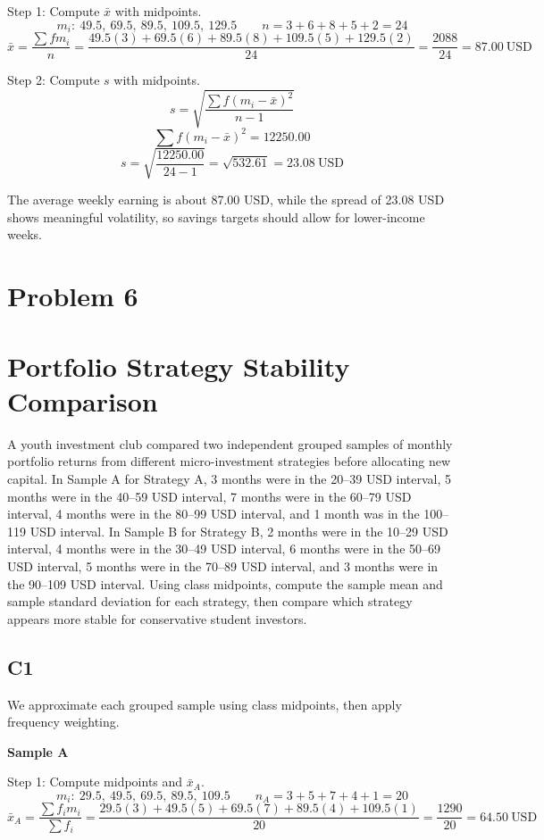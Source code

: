\begin{ExamProblems}
		Step 1: Compute $\bar{x}$ with midpoints.
		\[
		m_i:\ 49.5,\ 69.5,\ 89.5,\ 109.5,\ 129.5
		\qquad
		n = 3+6+8+5+2 = 24
		\]
		\[
		\bar{x} = \frac{\sum f m_i}{n}
		= \frac{49.5(3)+69.5(6)+89.5(8)+109.5(5)+129.5(2)}{24}
		= \frac{2088}{24}
		= 87.00\ \text{USD}
		\]

		Step 2: Compute $s$ with midpoints.
		\[
		s = \sqrt{\frac{\sum f(m_i-\bar{x})^2}{n-1}}
		\]
		\[
		\sum f(m_i-\bar{x})^2 = 12250.00
		\]
		\[
		s = \sqrt{\frac{12250.00}{24-1}} = \sqrt{532.61} = 23.08\ \text{USD}
		\]

		The average weekly earning is about 87.00 USD, while the spread of 23.08 USD shows meaningful volatility, so savings targets should allow for lower-income weeks.

		\newpage
		\item
		\section{Problem 6}
		\section{Portfolio Strategy Stability Comparison}
		A youth investment club compared two independent grouped samples of monthly portfolio returns from different micro-investment strategies before allocating new capital. In Sample A for Strategy A, 3 months were in the 20--39 USD interval, 5 months were in the 40--59 USD interval, 7 months were in the 60--79 USD interval, 4 months were in the 80--99 USD interval, and 1 month was in the 100--119 USD interval. In Sample B for Strategy B, 2 months were in the 10--29 USD interval, 4 months were in the 30--49 USD interval, 6 months were in the 50--69 USD interval, 5 months were in the 70--89 USD interval, and 3 months were in the 90--109 USD interval. Using class midpoints, compute the sample mean and sample standard deviation for each strategy, then compare which strategy appears more stable for conservative student investors.

		\subsection*{C1}
		We approximate each grouped sample using class midpoints, then apply frequency weighting.

		\textbf{Sample A}

		Step 1: Compute midpoints and $\bar{x}_A$.
		\[
		m_i:\ 29.5,\ 49.5,\ 69.5,\ 89.5,\ 109.5
		\qquad
		n_A = 3+5+7+4+1 = 20
		\]
		\[
		\bar{x}_A = \frac{\sum f_i m_i}{\sum f_i}
		= \frac{29.5(3)+49.5(5)+69.5(7)+89.5(4)+109.5(1)}{20}
		= \frac{1290}{20}
		= 64.50\ \text{USD}
		\]


\end{ExamProblems}

